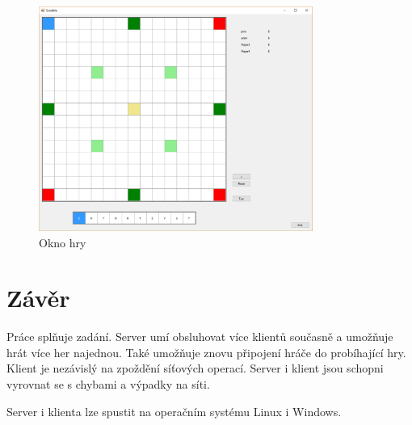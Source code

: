 \begin{figure}[H]
	\centering
	\includegraphics[width=0.8\textwidth]{img/game.eps}
	\caption{Okno hry}
  \label{game}
\end{figure}



\chapter{Závěr}
Práce splňuje zadání. Server umí obsluhovat více klientů současně a umožňuje hrát více her najednou. Také umožňuje znovu připojení hráče do probíhající hry. Klient je nezávislý na zpoždění síťových operací. Server i klient jsou schopni vyrovnat se s chybami a výpadky na síti.

Server i klienta lze spustit na operačním systému Linux i Windows.